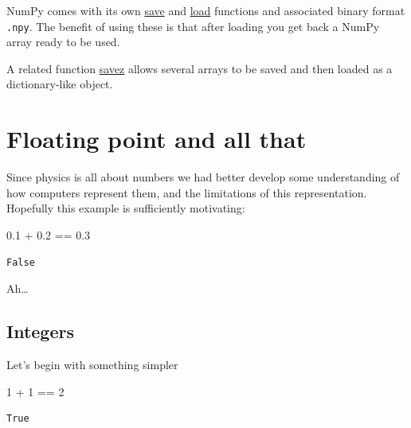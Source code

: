\documentclass[
  letterpaper,
  DIV=11,
  numbers=noendperiod]{scrreprt}
\newenvironment{Shaded}{\begin{snugshade}}{\end{snugshade}}
\newcommand{\DecValTok}[1]{\textcolor[rgb]{0.68,0.00,0.00}{#1}}
\newcommand{\FloatTok}[1]{\textcolor[rgb]{0.68,0.00,0.00}{#1}}
\newcommand{\OperatorTok}[1]{\textcolor[rgb]{0.37,0.37,0.37}{#1}}
\theoremstyle{definition}
\theoremstyle{remark}
\begin{document}
NumPy comes with its own
\href{https://numpy.org/doc/stable/reference/generated/numpy.save.html}{save}
and
\href{https://numpy.org/doc/stable/reference/generated/numpy.load.html}{load}
functions and associated binary format \texttt{.npy}. The benefit of
using these is that after loading you get back a NumPy array ready to be
used.

A related function
\href{https://numpy.org/doc/stable/reference/generated/numpy.savez.html}{savez}
allows several arrays to be saved and then loaded as a dictionary-like
object.


\hypertarget{floating-point-and-all-that}{%
\chapter{Floating point and all
that}\label{floating-point-and-all-that}}

Since physics is all about numbers we had better develop some
understanding of how computers represent them, and the limitations of
this representation. Hopefully this example is sufficiently motivating:

\begin{Shaded}
\begin{Highlighting}[]
\FloatTok{0.1}  \OperatorTok{+} \FloatTok{0.2} \OperatorTok{==} \FloatTok{0.3}
\end{Highlighting}
\end{Shaded}

\begin{verbatim}
False
\end{verbatim}

Ah\ldots{}

\hypertarget{integers}{%
\section{Integers}\label{integers}}

Let's begin with something simpler

\begin{Shaded}
\begin{Highlighting}[]
\DecValTok{1} \OperatorTok{+} \DecValTok{1} \OperatorTok{==} \DecValTok{2}
\end{Highlighting}
\end{Shaded}

\begin{verbatim}
True
\end{verbatim}
\end{document}
